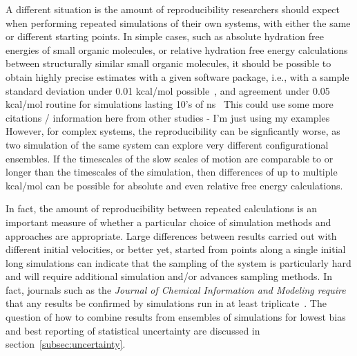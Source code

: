 \documentclass[9pt,bestpractices]{livecoms}
\begin{document}
A different situation is the amount of reproducibility researchers should expect when performing repeated simulations of their own systems, with either the same or different starting points. In simple cases, such as absolute hydration free energies of small organic molecules, or relative hydration free energy calculations between structurally similar small organic molecules, it should be possible to obtain highly precise estimates with a given software package, i.e., with a sample standard deviation under 0.01 kcal/mol possible~\cite{rizzi2019sampl6}, and agreement under 0.05 kcal/mol routine for simulations lasting 10's of ns~\cite{paliwal2011benchmark} {\color{red}This could use some more citations / information here from other studies - I'm just using my examples} However, for complex systems, the reproducibility can be signficantly worse, as two simulation of the same system can explore very different configurational ensembles.  If the timescales of the slow scales of motion are comparable to or longer than the timescales of the simulation, then differences of up to multiple kcal/mol can be possible for absolute and even relative free energy calculations. 

In fact, the amount of reproducibility between repeated calculations is an important measure of whether a particular choice of simulation methods and approaches are appropriate.  Large differences between results carried out with different initial velocities, or better yet, started from points along a single initial long simulations can indicate that the sampling of the system is particularly hard and will require additional simulation and/or advances sampling methods.  In fact, journals such as the \textit{Journal of Chemical Information and Modeling require} that any results be confirmed by simulations run in at least triplicate~\cite{soares2023guidelines}. The question of how to combine results from ensembles of simulations for lowest bias and best reporting of statistical uncertainty are discussed in section~\ref{subsec:uncertainty}.

\end{document}
